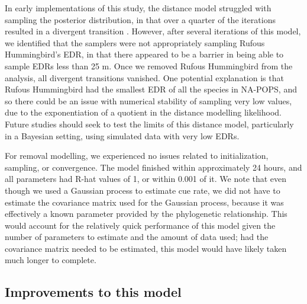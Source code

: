 \par In early implementations of this study, the distance model struggled with sampling the posterior distribution, in that over a quarter of the iterations resulted in a divergent transition \citep{betancourt_diagnosing_2016, leimkuhler_simulating_2005}.
However, after several iterations of this model, we identified that the samplers were not appropriately sampling Rufous Hummingbird's EDR, in that there appeared to be a barrier in being able to sample EDRs less than 25 m. 
Once we removed Rufous Hummingbird from the analysis, all divergent transitions vanished.
One potential explanation is that Rufous Hummingbird had the smallest EDR of all the species in NA-POPS, and so there could be an issue with numerical stability of sampling very low values, due to the exponentiation of a quotient in the distance modelling likelihood.
Future studies should seek to test the limits of this distance model, particularly in a Bayesian setting, using simulated data with very low EDRs.

\par For removal modelling, we experienced no issues related to initialization, sampling, or convergence. 
The model finished within approximately 24 hours, and all parameters had R-hat values of 1, or within 0.001 of it.
We note that even though we used a Gaussian process to estimate cue rate, we did not have to estimate the covariance matrix used for the Gaussian process, because it was effectively a known parameter provided by the phylogenetic relationship.
This would account for the relatively quick performance of this model given the number of parameters to estimate and the amount of data used; had the covariance matrix needed to be estimated, this model would have likely taken much longer to complete.

\subsection{Improvements to this model}

